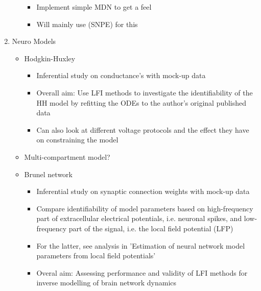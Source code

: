 \begin{enumerate}
\begin{itemize}
        \begin{itemize}
            \item Implement simple MDN to get a feel 
            \item Will mainly use  (SNPE) for this
        \end{itemize}
    \end{itemize}
    \item Neuro Models 
    \begin{itemize}
        \item Hodgkin-Huxley
        \begin{itemize}
            \item Inferential study on conductance's with mock-up data
            \item Overall aim: Use LFI methods to investigate the identifiability of the HH model by refitting the ODEs to the author's original published data
            \item Can also look at different voltage protocols and the effect they have on constraining the model 
        \end{itemize}
        \item Multi-compartment model? 
        \item Brunel network 
        \begin{itemize}
            \item Inferential study on synaptic connection weights with mock-up data
            \item Compare identifiability of model parameters based on high-frequency part of extracellular electrical potentials, i.e. neuronal spikes, and low-frequency part of the signal, i.e. the local field potential (LFP)
             \item For the latter, see analysis in 'Estimation of neural network model parameters from local field potentials'
             \item Overal aim: Assessing performance and validity of LFI methods for inverse modelling of brain network dynamics
        \end{itemize}
    \end{itemize}
\end{enumerate}

